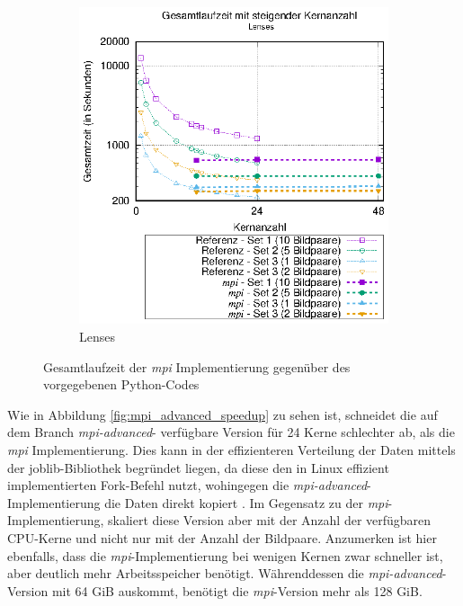 \begin{center}
\begin{figure}[htbp]
\begin{subfigure}[b]{0.45\textwidth}
			\includegraphics[width=\textwidth]{pdf/mpi_times_lenses}
			\caption{Lenses}
			\label{fig:mpi_times_lenses}
		\end{subfigure}
		\caption{Gesamtlaufzeit der \textit{mpi} Implementierung gegenüber des vorgegebenen Python-Codes}
		\label{fig:mpi_times}
	\end{figure}
\end{center}

Wie in Abbildung \ref{fig:mpi_advanced_speedup} zu sehen ist, schneidet die auf dem Branch \textit{mpi-advanced}-\cite{Coj17} verfügbare Version für 24 Kerne schlechter ab, als die \textit{mpi} Implementierung. Dies kann in der effizienteren Verteilung der Daten mittels der joblib-Bibliothek begründet liegen, da diese den in Linux effizient implementierten Fork-Befehl nutzt, wohingegen die \textit{mpi-advanced}-Implementierung die Daten direkt kopiert \cite{GVB+18}. Im Gegensatz zu der \textit{mpi}-Implementierung, skaliert diese Version aber mit der Anzahl der verfügbaren \gls{CPU}-Kerne und nicht nur mit der Anzahl der Bildpaare. Anzumerken ist hier ebenfalls, dass die \textit{mpi}-Implementierung bei wenigen Kernen zwar schneller ist, aber deutlich mehr Arbeitsspeicher benötigt. Währenddessen die \textit{mpi-advanced}-Version mit 64 \gls{GiB} auskommt, benötigt die \textit{mpi}-Version mehr als 128 \gls{GiB}.

